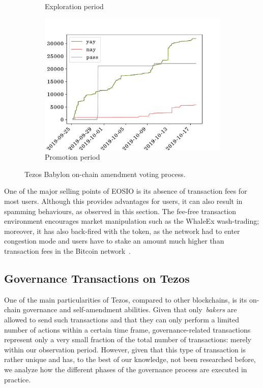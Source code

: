 \begin{figure}[tb]
\begin{subfigure}{0.323\textwidth}
    \caption{Exploration period}
  \end{subfigure}
  \begin{subfigure}{0.323\textwidth}
    \centering
    \includegraphics[width=\columnwidth]{./4-transactions-security/figures/babylon-promotion.pdf}
    \caption{Promotion period}
  \end{subfigure}
  \caption{Tezos Babylon on-chain amendment voting process.}
  \label{fig:tezos-votes}
\end{figure}

One of the major selling points of EOSIO is its absence of transaction fees for most users. Although this provides advantages for users, it can also result in spamming behaviours, as observed in this section. The fee-free transaction environment encourages market manipulation such as the WhaleEx wash-trading; moreover, it has also back-fired with the  token, as the network had to enter congestion mode and users have to stake an amount much higher than transaction fees in the Bitcoin network~\cite{EarnBet2019EOSNotice}.


\subsection{Governance Transactions on Tezos}
One of the main particularities of Tezos, compared to other blockchains, is its on-chain governance and self-amendment abilities. Given that only~\emph{bakers} are allowed to send such transactions and that they can only perform a limited number of actions within a certain time frame, governance-related transactions represent only a very small fraction of the total number of transactions: merely~ within our observation period. However, given that this type of transaction is rather unique and has, to the best of our knowledge, not been researched before, we analyze how the different phases of the governance process are executed in practice.

